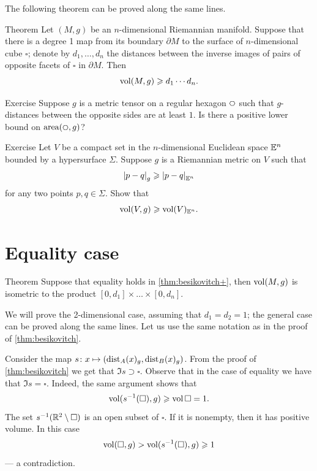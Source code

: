 The following theorem can be proved along the same lines.


\begin{thm}{Theorem}\label{thm:besikovitch+}
Let $(M,g)$ be an $n$-dimensional Riemannian manifold.
Suppose that there is a degree 1 map from its boundary $\partial M$ to the surface of $n$-dimensional cube $\square$;
denote by $d_1,\dots, d_n$ the distances between the inverse images of pairs of opposite facets of $\square$ in $\partial M$.
Then 
\[\operatorname{\rm vol}\nolimits(M,g)\geqslant d_1\cdots d_n.\]
\end{thm}

\begin{thm}{Exercise}\label{ex:hexagon}
Suppose $g$ is a metric tensor on a regular hexagon $\text{\rm\hexagon}$ such that $g$-distances between the opposite sides are at least $1$.
Is there a positive lower bound on $\area(\text{\rm\hexagon},g)$?
\end{thm}



\begin{thm}{Exercise}\label{ex:gadograph}
Let $V$ be a compact set in the $n$-dimensional Euclidean space $\mathbb{E}^n$ bounded by a hypersurface $\Sigma$.
Suppose $g$ is a Riemannian metric on $V$ such that 
\[\dist{p}{q}{g}\ge\dist{p}{q}{\EE^n}\]
for any two points $p,q\in \Sigma$.
Show that
\[\operatorname{\rm vol}\nolimits(V,g)\geqslant \operatorname{\rm vol}\nolimits(V)_{\mathbb{E}^n}.\]
 
\end{thm}

\section{Equality case}

\begin{thm}{Theorem}\label{thm:besicovitch=}
Suppose that equality holds in \ref{thm:besikovitch+},
then $\operatorname{\rm vol}\nolimits(M,g)$ is isometric to the product $[0,d_1]\times\dots\times[0,d_n]$.
\end{thm}
 
We will prove the 2-dimensional case, assuming that $d_1=d_2=1$;
the general case can be proved along the same lines.
Let us use the same notation as in the proof of \ref{thm:besikovitch}.

Consider the map $s\colon x\mapsto(\mathrm{dist}_A(x)_g,\mathrm{dist}_B(x)_g)$.
From the proof of \ref{thm:besikovitch} we get that $\Im s\supset \square$.
Observe that in the case of equality we have that $\Im s= \square$.
Indeed,
the same argument shows that 
\[\operatorname{\rm vol}\nolimits(s^{-1}(\square),g)\geqslant \operatorname{\rm vol}\nolimits\square=1.\]
The set $s^{-1}(\mathbb{R}^2\setminus \square)$ is an open subset of $\square$.
If it is nonempty, then it has positive volume.
In this case
\[\operatorname{\rm vol}\nolimits(\square,g)>\operatorname{\rm vol}\nolimits(s^{-1}(\square),g)\geqslant 1\]
--- a contradiction.

